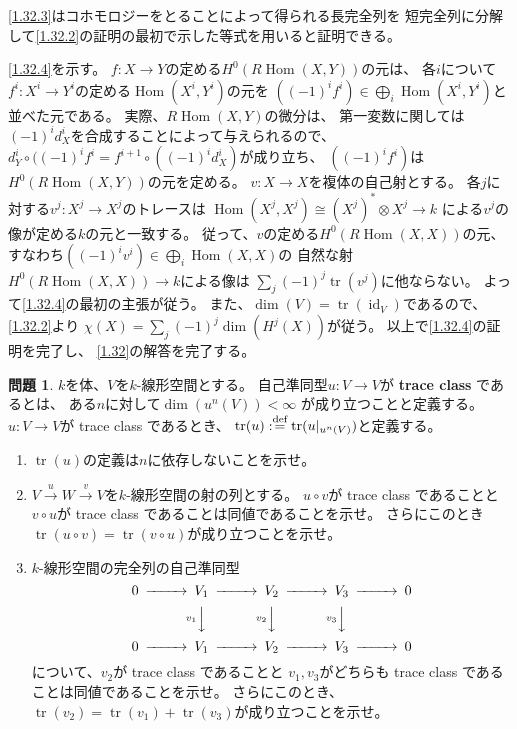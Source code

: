 \documentclass[uplatex,dvipdfmx]{jsarticle}
\makeatletter
\theoremstyle{definition}
\newtheorem{prob}[prob]{問題}
\renewenvironment{proof}[1][\proofname]{
  \pushQED{\qed}%
  \normalfont \topsep6\p@\@plus6\p@\relax
  \trivlist
  \item[\hskip\labelsep
    #1\@addpunct{\textbf{.}}]\ignorespaces
}{%
  \popQED\endtrivlist\@endpefalse
}
\providecommand{\proofname}{証明}
\DeclareMathOperator{\Hom}{\mathrm{Hom}}
\DeclareMathOperator{\id}{\mathrm{id}}
\DeclareMathOperator{\tr}{\mathrm{tr}}
\def\dfn{:\overset{\mbox{{\scriptsize def}}}{=}}
\makeatother
\begin{document}
\begin{proof}
  \ref{1.32.3}はコホモロジーをとることによって得られる長完全列を
  短完全列に分解して\ref{1.32.2}の証明の最初で示した等式を用いると証明できる。

  \ref{1.32.4}を示す。
  \(f:X\to Y\)の定める\(H^0(R\Hom(X,Y))\)の元は、
  各\(i\)について\(f^i:X^i\to Y^i\)の定める\(\Hom(X^i,Y^i)\)の元を
  \(((-1)^if^i)\in \bigoplus_i \Hom(X^i,Y^i)\)と並べた元である。
  実際、\(R\Hom(X,Y)\)の微分は、
  第一変数に関しては\((-1)^id_X^i\)を合成することによって与えられるので、
  \(d_Y^i\circ ((-1)^if^i = f^{i+1}\circ ((-1)^id_X^i)\)が成り立ち、
  \(((-1)^if^i)\)は\(H^0(R\Hom(X,Y))\)の元を定める。
  \(v:X\to X\)を複体の自己射とする。
  各\(j\)に対する\(v^j:X^j \to X^j\)のトレースは
  \(\Hom(X^j,X^j) \cong (X^j)^*\otimes X^j \to k\)
  による\(v^j\)の像が定める\(k\)の元と一致する。
  従って、\(v\)の定める\(H^0(R\Hom(X,X))\)の元、
  すなわち\(((-1)^iv^i)\in \bigoplus_i \Hom(X,X)\)の
  自然な射\(H^0(R\Hom(X,X))\to k\)による像は
  \(\sum_j(-1)^j\tr(v^j)\)に他ならない。
  よって\ref{1.32.4}の最初の主張が従う。
  また、\(\dim(V) = \tr(\id_V)\)であるので、
  \ref{1.32.2}より
  \(\chi(X) = \sum_j(-1)^j\dim(H^j(X))\)が従う。
  以上で\ref{1.32.4}の証明を完了し、
  \autoref{1.32}の解答を完了する。
\end{proof}






\begin{prob}\label{1.33}
  \(k\)を体、\(V\)を\(k\)-線形空間とする。
  自己準同型\(u:V\to V\)が
  \textbf{trace class}
  であるとは、
  ある\(n\)に対して\(\dim(u^n(V)) < \infty\)
  が成り立つことと定義する。
  \(u:V\to V\)が trace class であるとき、
  \(\tr(u) \dfn \tr(u|_{u^n(V)})\)と定義する。
  \begin{enumerate}
    \item \label{1.33.1}
    \(\tr(u)\)の定義は\(n\)に依存しないことを示せ。
    \item \label{1.33.2}
    \(V\xrightarrow{u} W \xrightarrow{v} V\)を\(k\)-線形空間の射の列とする。
    \(u\circ v\)が trace class であることと
    \(v\circ u\)が trace class であることは同値であることを示せ。
    さらにこのとき\(\tr(u\circ v) = \tr(v\circ u)\)が成り立つことを示せ。
    \item \label{1.33.3}
    \(k\)-線形空間の完全列の自己準同型
    \[
    \begin{CD}
      0 @>>> V_1 @>>> V_2 @>>> V_3 @>>> 0 \\
      @. @V{v_1}VV @V{v_2}VV @V{v_3}VV @. \\
      0 @>>> V_1 @>>> V_2 @>>> V_3 @>>> 0
    \end{CD}
    \]
    について、\(v_2\)が trace class であることと
    \(v_1,v_3\)がどちらも trace class であることは同値であることを示せ。
    さらにこのとき、\(\tr(v_2) = \tr(v_1) + \tr(v_3)\)が成り立つことを示せ。
  \end{enumerate}
\end{prob}
\end{document}
